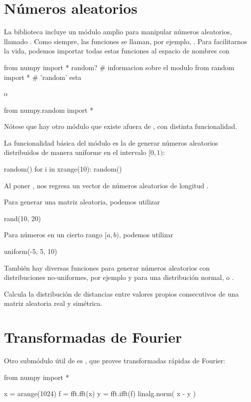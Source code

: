 \section{Números aleatorios}

La biblioteca  incluye un módulo amplio para manipular números aleatorios, llamado .
Como siempre, las funciones se llaman, por ejemplo, . Para facilitarnos la vida, podemos importar todas estas funciones al espacio de nombres con
\begin{python}
from numpy import *
random?	# informacion sobre el modulo
from random import *		# 'random' esta
\end{python}
o
\begin{python}
from numpy.random import *
\end{python}
Nótese que hay otro módulo  que existe afuera de , con distinta funcionalidad.

La funcionalidad básica del módulo es la de generar números aleatorios distribuidos de manera uniforme en el intervalo $[0,1)$:
\begin{python}
random()
for i in xrange(10): 
  random()
\end{python}
Al poner , nos regresa un vector de números aleatorios de longitud .

Para generar una matriz aleatoria, podemos utilizar
\begin{python}
rand(10, 20)
\end{python}
Para números en un cierto rango $[a, b)$, podemos utilizar 
\begin{python}
uniform(-5, 5, 10)
\end{python}


También hay diversas funciones para generar números aleatorios con distribuciones no-uniformes, por ejemplo  y  para una distribución normal, o .





\ej Calcula la distribución de distancias entre valores propios consecutivos de una matriz aleatoria real y simétrica.


\section{Transformadas de Fourier}
Otro submódulo útil de  es , que provee transformadas rápidas de Fourier:
\begin{python}
from numpy import *

x = arange(1024)
f = fft.fft(x)
y = fft.ifft(f)
linalg.norm( x - y )
\end{python}










 
















